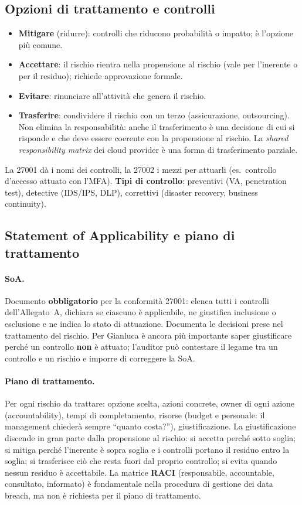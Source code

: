 \subsection{Opzioni di trattamento e controlli}
\begin{itemize}
  \item \textbf{Mitigare} (ridurre): controlli che riducono probabilità o impatto; è l'opzione più comune.
  \item \textbf{Accettare}: il rischio rientra nella propensione al rischio (vale per l'inerente o per il
    residuo); richiede approvazione formale.
  \item \textbf{Evitare}: rinunciare all'attività che genera il rischio.
  \item \textbf{Trasferire}: condividere il rischio con un terzo (assicurazione, outsourcing). Non elimina
    la responsabilità: anche il trasferimento è una decisione di cui si risponde e che deve essere coerente
    con la propensione al rischio. La \emph{shared responsibility matrix} dei cloud provider è una forma di
    trasferimento parziale.
\end{itemize}
La 27001 dà i nomi dei controlli, la 27002 i mezzi per attuarli (es.\ controllo d'accesso attuato con
l'MFA). \textbf{Tipi di controllo}: preventivi (VA, penetration test), detective (IDS/IPS, DLP),
correttivi (disaster recovery, business continuity).

\subsection{Statement of Applicability e piano di trattamento}
\paragraph{SoA.} Documento \textbf{obbligatorio} per la conformità 27001: elenca tutti i controlli
dell'Allegato~A, dichiara se ciascuno è applicabile, ne giustifica inclusione o esclusione e ne indica lo
stato di attuazione. Documenta le decisioni prese nel trattamento del rischio. Per Gianluca è ancora più
importante saper giustificare perché un controllo \textbf{non} è attuato; l'auditor può contestare il
legame tra un controllo e un rischio e imporre di correggere la SoA.

\paragraph{Piano di trattamento.} Per ogni rischio da trattare: opzione scelta, azioni concrete, owner di
ogni azione (accountability), tempi di completamento, risorse (budget e personale: il management chiederà
sempre ``quanto costa?''), giustificazione. La giustificazione discende in gran parte dalla propensione al
rischio: si accetta perché sotto soglia; si mitiga perché l'inerente è sopra soglia e i controlli portano il
residuo entro la soglia; si trasferisce ciò che resta fuori dal proprio controllo; si evita quando nessun
residuo è accettabile. La matrice \textbf{RACI} (responsabile, accountable, consultato, informato) è
fondamentale nella procedura di gestione dei data breach, ma non è richiesta per il piano di trattamento.

